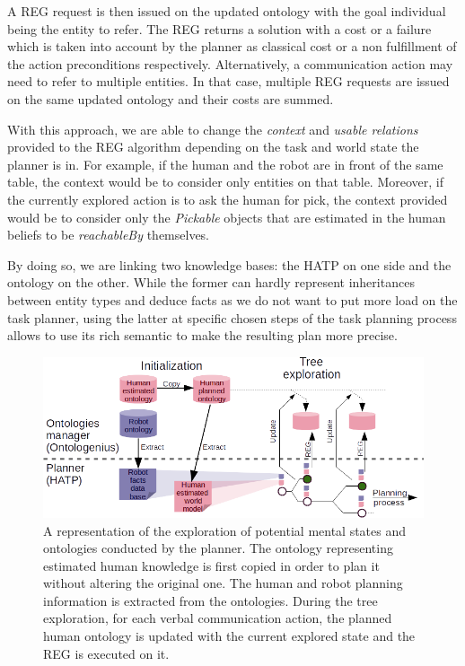 \documentclass[a4paper,11pt,twoside]{StyleThese}
\begin{document}
A REG request is then issued on the updated ontology with the goal individual being the entity to refer. The REG returns a solution with a cost or a failure which is taken into account by the planner as classical cost or a non fulfillment of the action preconditions respectively. Alternatively, a communication action may need to refer to multiple entities. In that case, multiple REG requests are issued on the same updated ontology and their costs are summed.

With this approach, we are able to change the \textit{context} and \textit{usable relations} provided to the REG algorithm depending on the task and world state the planner is in. For example, if the human and the robot are in front of the same table, the context would be to consider only entities on that table. Moreover, if the currently explored action is to ask the human for pick, the context provided would be to consider only the \textit{Pickable} objects that are estimated in the human beliefs to be \textit{reachableBy} themselves.

By doing so, we are linking two knowledge bases: the HATP on one side and the ontology on the other. While the former can hardly represent inheritances between entity types and deduce facts as we do not want to put more load on the task planner, using the latter at specific chosen steps of the task planning process allows to use its rich semantic to make the resulting plan more precise.

\begin{figure}[t!]
\centering
\includegraphics[width=\textwidth]{figures/chapter3/struct.png}
\caption{\label{fig:integration} A representation of the exploration of potential mental states and ontologies conducted by the planner. The ontology representing estimated human knowledge is first copied in order to plan it without altering the original one. The human and robot planning information is extracted from the ontologies. During the tree exploration, for each verbal communication action, the planned human ontology is updated with the current explored state and the REG is executed on it.}
\end{figure}
\end{document}
